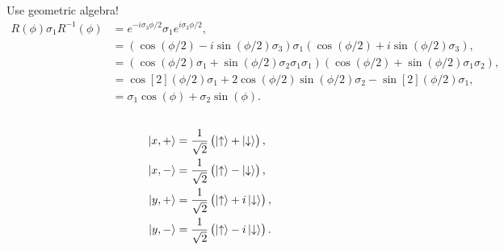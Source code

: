 \documentclass[a4paper,12pt,twoside]{article}
\begin{document}
\subsection{}%
Use geometric algebra!
\begin{align}
	R(\phi)\sigma_1 R^{-1}(\phi)
	&= e^{-i\sigma_{3}\phi/2}\sigma_1 e^{i\sigma_{3}\phi/2},\\
	&= \left( \cos(\phi/2)-i\sin(\phi/2)\sigma_3 \right)\sigma_1\left( \cos(\phi/2)+i\sin(\phi/2)\sigma_3 \right),\\
	&= \left( \cos(\phi/2)\sigma_1+\sin(\phi/2)\sigma_2\sigma_1\sigma_1 \right)\left( \cos(\phi/2)+\sin(\phi/2)\sigma_1\sigma_2 \right),\\
	&= \cos[2](\phi/2)\sigma_1+2\cos(\phi/2)\sin(\phi/2)\sigma_2 - \sin[2](\phi/2)\sigma_1,\\
	&= \sigma_1 \cos(\phi) + \sigma_2 \sin(\phi).
\end{align}
\subsection{}%
\subsubsection{}
\begin{align}
	\ket{x,+} &= \frac{1}{\sqrt{2}}\left(\ket{\uparrow}+\ket{\downarrow}\right),\\
	\ket{x,-} &= \frac{1}{\sqrt{2}}\left(\ket{\uparrow}-\ket{\downarrow}\right),\\
	\ket{y,+} &= \frac{1}{\sqrt{2}}\left(\ket{\uparrow}+i\ket{\downarrow}\right),\\
	\ket{y,-} &= \frac{1}{\sqrt{2}}\left(\ket{\uparrow}-i\ket{\downarrow}\right).
\end{align}
\end{document}

